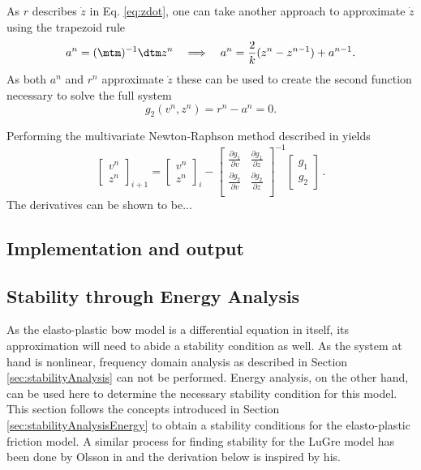As $r$ describes $\dot z$ in Eq. \eqref{eq:zdot}, one can take another approach to approximate $\dot z$ using the trapezoid rule \cite{theBible}
\begin{equation}
    a^n = (\mtm)^{-1}\dtm z^n \quad \Longrightarrow\quad a^n = \frac{2}{k}(z^n - z^{n-1}) + a^{n-1}.
\end{equation}
As both $a^n$ and $r^n$ approximate $\dot z$ these can be used to create the second function necessary to solve the full system
\begin{equation}
    g_2(v^n, z^n) = r^n - a^n = 0.
\end{equation}

Performing the multivariate Newton-Raphson method described in yields
\begin{equation}\label{eq:NRit}
    \begin{bmatrix}
    v^n\\
    z^n
    \end{bmatrix}_{i+1}
    =
    \begin{bmatrix}
    v^n\\
    z^n
    \end{bmatrix}_i
    -
    \begin{bmatrix}
    \frac{\partial g_1}{\partial v} & \frac{\partial g_1}{\partial z}\\
    \frac{\partial g_2}{\partial v} & \frac{\partial g_2}{\partial z}\\
    \end{bmatrix}^{-1}
    \begin{bmatrix}
    g_1\\
    g_2
    \end{bmatrix}\,
    .
\end{equation}
The derivatives can be shown to be... 

\subsection{Implementation and output}


\subsection{Stability through Energy Analysis}
As the elasto-plastic bow model is a differential equation in itself, its approximation will need to abide a stability condition as well.
As the system at hand is nonlinear, frequency domain analysis as described in Section \ref{sec:stabilityAnalysis} can not be performed. Energy analysis, on the other hand, can be used here to determine the necessary stability condition for this model. This section follows the concepts introduced in Section \ref{sec:stabilityAnalysisEnergy} to obtain a stability conditions for the elasto-plastic friction model. A similar process for finding stability for the LuGre model has been done by Olsson in \cite[p. 55]{Olsson1996} and the derivation below is inspired by his. 

